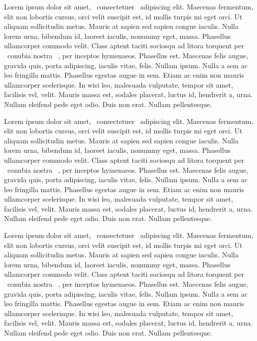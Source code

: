 \documentclass{article}
\begin{document}
Lorem ipsum dolor sit amet,  ~consectetuer~  adipiscing elit. Maecenas fermentum, elit non lobortis cursus, orci velit suscipit est, id mollis turpis mi eget orci. Ut aliquam sollicitudin metus. Mauris at sapien sed sapien congue iaculis. Nulla lorem urna, bibendum id, laoreet iaculis, nonummy eget, massa. Phasellus ullamcorper commodo velit. Class aptent taciti sociosqu ad litora torquent per  ~conubia nostra~ , per inceptos hymenaeos. Phasellus est. Maecenas felis augue, gravida quis, porta adipiscing, iaculis vitae, felis. Nullam ipsum. Nulla a sem ac leo fringilla mattis. Phasellus egestas augue in sem. Etiam ac enim non mauris ullamcorper scelerisque. In wisi leo, malesuada vulputate, tempor sit amet, facilisis vel, velit. Mauris massa est, sodales placerat, luctus id, hendrerit a, urna. Nullam eleifend pede eget odio. Duis non erat. Nullam pellentesque.

Lorem ipsum dolor sit amet,  ~consectetuer~  adipiscing elit. Maecenas fermentum, elit non lobortis cursus, orci velit suscipit est, id mollis turpis mi eget orci. Ut aliquam sollicitudin metus. Mauris at sapien sed sapien congue iaculis. Nulla lorem urna, bibendum id, laoreet iaculis, nonummy eget, massa. Phasellus ullamcorper commodo velit. Class aptent taciti sociosqu ad litora torquent per  ~conubia nostra~ , per inceptos hymenaeos. Phasellus est. Maecenas felis augue, gravida quis, porta adipiscing, iaculis vitae, felis. Nullam ipsum. Nulla a sem ac leo fringilla mattis. Phasellus egestas augue in sem. Etiam ac enim non mauris ullamcorper scelerisque. In wisi leo, malesuada vulputate, tempor sit amet, facilisis vel, velit. Mauris massa est, sodales placerat, luctus id, hendrerit a, urna. Nullam eleifend pede eget odio. Duis non erat. Nullam pellentesque.

Lorem ipsum dolor sit amet,  ~consectetuer~  adipiscing elit. Maecenas fermentum, elit non lobortis cursus, orci velit suscipit est, id mollis turpis mi eget orci. Ut aliquam sollicitudin metus. Mauris at sapien sed sapien congue iaculis. Nulla lorem urna, bibendum id, laoreet iaculis, nonummy eget, massa. Phasellus ullamcorper commodo velit. Class aptent taciti sociosqu ad litora torquent per  ~conubia nostra~ , per inceptos hymenaeos. Phasellus est. Maecenas felis augue, gravida quis, porta adipiscing, iaculis vitae, felis. Nullam ipsum. Nulla a sem ac leo fringilla mattis. Phasellus egestas augue in sem. Etiam ac enim non mauris ullamcorper scelerisque. In wisi leo, malesuada vulputate, tempor sit amet, facilisis vel, velit. Mauris massa est, sodales placerat, luctus id, hendrerit a, urna. Nullam eleifend pede eget odio. Duis non erat. Nullam pellentesque.
\end{document}
